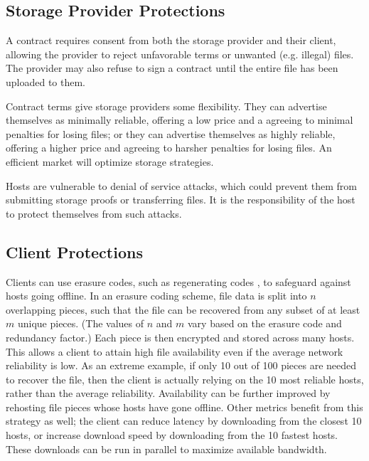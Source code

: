 \documentclass[twocolumn]{article}
\begin{document}
\subsection{Storage Provider Protections}
A contract requires consent from both the storage provider and their client, allowing the provider to reject unfavorable terms or unwanted (e.g. illegal) files.
The provider may also refuse to sign a contract until the entire file has been uploaded to them.

Contract terms give storage providers some flexibility.
They can advertise themselves as minimally reliable, offering a low price and a agreeing to minimal penalties for losing files;
or they can advertise themselves as highly reliable, offering a higher price and agreeing to harsher penalties for losing files.
An efficient market will optimize storage strategies.

Hosts are vulnerable to denial of service attacks, which could prevent them from submitting storage proofs or transferring files.
It is the responsibility of the host to protect themselves from such attacks.

\subsection{Client Protections}
Clients can use erasure codes, such as regenerating codes \cite{reg}, to safeguard against hosts going offline.
In an erasure coding scheme, file data is split into $n$ overlapping pieces, such that the file can be recovered from any subset of at least $m$ unique pieces.
(The values of $n$ and $m$ vary based on the erasure code and redundancy factor.)
Each piece is then encrypted and stored across many hosts.
This allows a client to attain high file availability even if the average network reliability is low.
As an extreme example, if only 10 out of 100 pieces are needed to recover the file, then the client is actually relying on the 10 most reliable hosts, rather than the average reliability.
Availability can be further improved by rehosting file pieces whose hosts have gone offline.
Other metrics benefit from this strategy as well; the client can reduce latency by downloading from the closest 10 hosts, or increase download speed by downloading from the 10 fastest hosts.
These downloads can be run in parallel to maximize available bandwidth.
\end{document}
